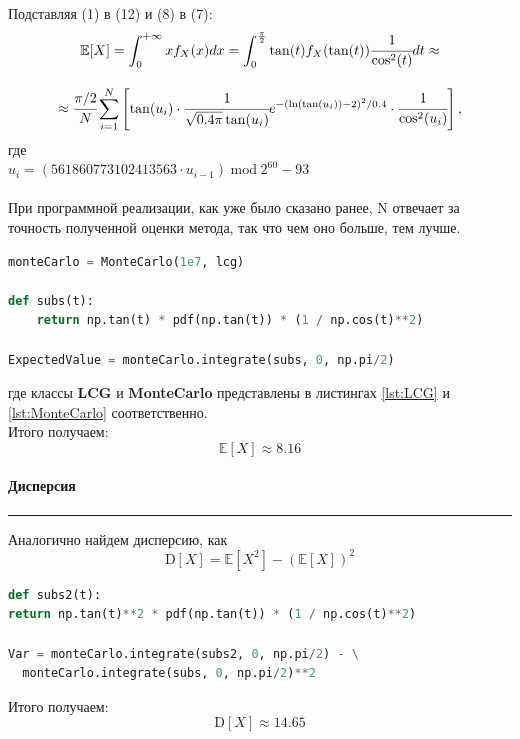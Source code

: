 \documentclass[a4paper, 14pt]{extarticle}
\begin{document}
Подставляя (1) в (12) и (8) в (7):
\begin{gather*}
  \mathbb{E}[X] = \int_{0}^{+\infty} x f_X(x)dx = 
  \int_{0}^{\frac{\pi}{2}} \tan(t) f_X(\tan(t)) \cfrac{1}{\cos^2(t)} dt \approx \\[1em]
  \approx \cfrac{\pi / 2}{N} \sum_{i=1}^{N} \left[ \tan(u_i) \cdot 
  \cfrac{1}{\sqrt{0.4 \pi} \tan(u_i)} e^{-(\ln(\tan(u_i)) - 2)^2 /0.4}  
  \cdot \cfrac{1}{\cos^2(u_i)} \right], 
\end{gather*}
где\\
$u_{i} = (561860773102413563 \cdot u_{i-1})\hspace{3pt} \text{mod} 
\hspace{3pt} 2^{60} - 93$ \\\\

При программной реализации, как уже было сказано ранее, 
N отвечает за точность полученной оценки метода, так 
что чем оно больше, тем лучше.\\

\begin{center}
  \begin{lstlisting}[language=Python]
monteCarlo = MonteCarlo(1e7, lcg)

def subs(t):
    return np.tan(t) * pdf(np.tan(t)) * (1 / np.cos(t)**2) 

ExpectedValue = monteCarlo.integrate(subs, 0, np.pi/2)
  \end{lstlisting}
\end{center}
\vspace{10pt}
где классы \textbf{LCG} и \textbf{MonteCarlo} представлены в листингах 
\ref{lst:LCG} и \ref{lst:MonteCarlo} соответственно.\\

Итого получаем:
\begin{equation*}
  \mathbb{E}[X] \approx 8.16
\end{equation*}

\paragraph{Дисперсия}\vspace{-20pt}\rule{\linewidth}{0.1mm}

Аналогично найдем дисперсию, как 
\begin{equation*}
  \text{D}[X] = \mathbb{E}[X^2] - (\mathbb{E}[X])^2
\end{equation*}

\begin{center}
  \begin{lstlisting}[language=Python]
def subs2(t):
return np.tan(t)**2 * pdf(np.tan(t)) * (1 / np.cos(t)**2) 

Var = monteCarlo.integrate(subs2, 0, np.pi/2) - \
  monteCarlo.integrate(subs, 0, np.pi/2)**2
  \end{lstlisting}
\end{center}
\vspace{10pt}
Итого получаем:
\begin{equation*}
  \text{D}[X] \approx 14.65
\end{equation*}
\end{document}
